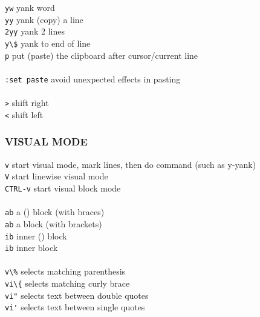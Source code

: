 \documentclass[10pt,a4paper,landscape]{article}
\begin{document}
\begin{multicols}{3}
    \colorbox{gray!20}{\lstinline{yw}}                  yank word \\
    \colorbox{gray!20}{\lstinline{yy}}                  yank (copy) a line \\
    \colorbox{gray!20}{\lstinline{2yy}}                 yank 2 lines \\
    \colorbox{gray!20}{\lstinline{y\$}}                  yank to end of line \\
    \colorbox{gray!20}{\lstinline{p}}                   put (paste) the clipboard after cursor/current line \\
\\
    \colorbox{gray!20}{\lstinline{:set paste}}          avoid unexpected effects in pasting \\
\\
    \colorbox{gray!20}{\lstinline{>}}                   shift right \\
    \colorbox{gray!20}{\lstinline{<}}                   shift left \\
    
    
    \subsubsection*{
    VISUAL MODE
    }
    
    \colorbox{gray!20}{\lstinline{v}}                   start visual mode, mark lines, then do command (such as y-yank) \\
    \colorbox{gray!20}{\lstinline{V}}                   start linewise visual mode \\
    \colorbox{gray!20}{\lstinline{CTRL-v}}              start visual block mode \\
\\
    \colorbox{gray!20}{\lstinline{ab}}                  a () block (with braces) \\
    \colorbox{gray!20}{\lstinline{ab}}                  a {} block (with brackets) \\
    \colorbox{gray!20}{\lstinline{ib}}                  inner () block \\
    \colorbox{gray!20}{\lstinline{ib}}                  inner {} block \\
\\
    \colorbox{gray!20}{\lstinline{v\%}}                  selects matching parenthesis \\
    \colorbox{gray!20}{\lstinline{vi\{}}                 selects matching curly brace \\
    \colorbox{gray!20}{\lstinline{vi"}}                 selects text between double quotes \\
    \colorbox{gray!20}{\lstinline{vi'}}                 selects text between single quotes \\
    

\end{multicols}
\end{document}
